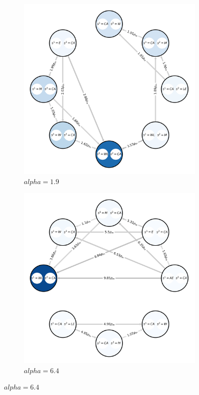 \begin{flushleft}
\begin{flushleft}
\begin{figure}[H]
            \begin{subfigure}[b]{0.39\linewidth}
                \includegraphics[width=\linewidth]{images/rg_1.9.png}
                \caption{$alpha=1.9$}
                \label{fig:response_graph_1.9}
            \end{subfigure}
            \hfill
            \begin{subfigure}[b]{0.39\linewidth}
                \includegraphics[width=\linewidth]{images/rg_6.4.png}
                \caption{$alpha=6.4$}
                \label{fig:response_graph_6.4}
            \end{subfigure}
        

\end{figure}
\end{flushleft}
\end{flushleft}
